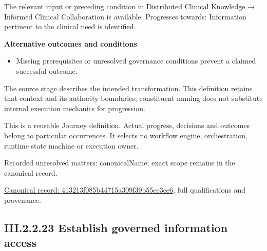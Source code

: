 The relevant input or preceding condition in Distributed Clinical Knowledge → Informed Clinical Collaboration is available. Progresses towards: Information pertinent to the clinical need is identified.



\par\medskip\textbf{Alternative outcomes and conditions}\par


\begin{itemize}


\item Missing prerequisites or unresolved governance conditions prevent a claimed successful outcome.

\end{itemize}


The source stage describes the intended transformation. This definition retains that context and its authority boundaries; constituent naming does not substitute internal execution mechanics for progression.



This is a reusable Journey definition. Actual progress, decisions and outcomes belong to particular occurrences. It selects no workflow engine, orchestration, runtime state machine or execution owner.


{\small Recorded unresolved matters: canonicalName; exact scope remains in the canonical record.}\par
{\footnotesize \href{../../../../../../../continuum/strategy/value-stream/413213f085b44715a309f39b55ee3ee6.md}{Canonical record: 413213f085b44715a309f39b55ee3ee6}; full qualifications and provenance.}\par
\subsection*{III.2.2.23 Establish governed information access}
\label{navigation:III.2.2.23}

